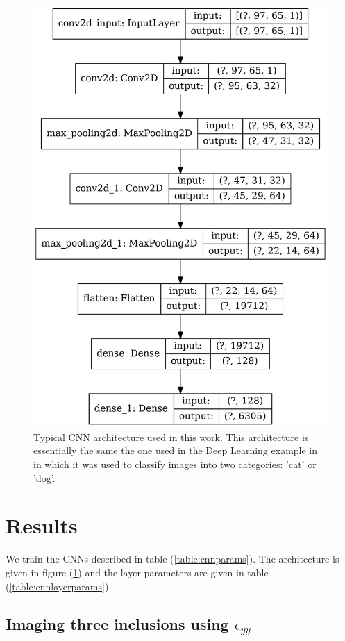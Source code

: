 \documentclass[12pt]{article}
\begin{document}
\begin{figure}[h] 
   \centering
    \includegraphics[totalheight=9cm]{Figures/typical_cnn.png}
    \caption{\label{fig:typical_cnn}Typical CNN architecture used in this work. This architecture is essentially the same the one used in the Deep Learning example in \cite{misc:udemy} in which it was used to classify images into two categories: 'cat' or 'dog'.}
\end{figure}
%
%
\section{Results}
We train the CNNs described in table (\ref{table:cnnparams}). The architecture is given in figure (\ref{fig:typical_cnn}) and the layer parameters are given in table (\ref{table:cnnlayerparams})
\subsection{Imaging three inclusions using $\epsilon_{yy}$}
\end{document}

